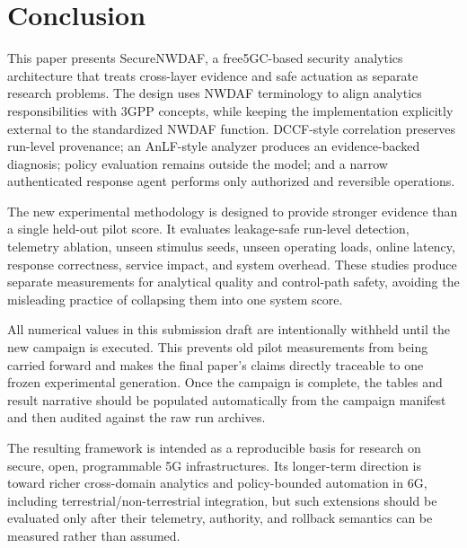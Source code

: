 \documentclass[sigconf,review]{acmart}
\begin{document}
\section{Conclusion}
This paper presents SecureNWDAF, a free5GC-based security analytics architecture that treats cross-layer evidence and safe actuation as separate research problems. The design uses NWDAF terminology to align analytics responsibilities with 3GPP concepts, while keeping the implementation explicitly external to the standardized NWDAF function. DCCF-style correlation preserves run-level provenance; an AnLF-style analyzer produces an evidence-backed diagnosis; policy evaluation remains outside the model; and a narrow authenticated response agent performs only authorized and reversible operations.

The new experimental methodology is designed to provide stronger evidence than a single held-out pilot score. It evaluates leakage-safe run-level detection, telemetry ablation, unseen stimulus seeds, unseen operating loads, online latency, response correctness, service impact, and system overhead. These studies produce separate measurements for analytical quality and control-path safety, avoiding the misleading practice of collapsing them into one system score.

All numerical values in this submission draft are intentionally withheld until the new campaign is executed. This prevents old pilot measurements from being carried forward and makes the final paper's claims directly traceable to one frozen experimental generation. Once the campaign is complete, the tables and result narrative should be populated automatically from the campaign manifest and then audited against the raw run archives.

The resulting framework is intended as a reproducible basis for research on secure, open, programmable 5G infrastructures. Its longer-term direction is toward richer cross-domain analytics and policy-bounded automation in 6G, including terrestrial/non-terrestrial integration, but such extensions should be evaluated only after their telemetry, authority, and rollback semantics can be measured rather than assumed.
\end{document}

